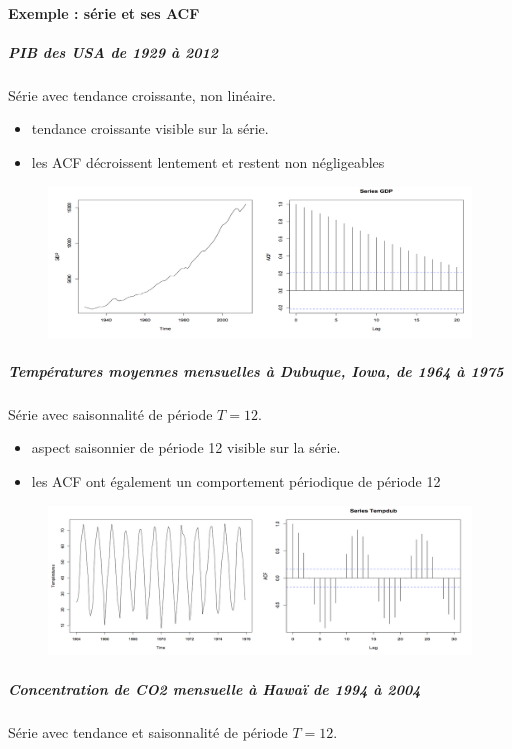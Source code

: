 \paragraph{Exemple : série et ses ACF}
\subparagraph{PIB des USA de 1929 à 2012}
Série avec tendance croissante, non linéaire.
\begin{itemize}
\item tendance croissante visible sur la série.
\item les ACF décroissent lentement et restent non négligeables
\end{itemize}
\begin{figure}[H]\begin{center}\includegraphics[scale=0.7]{ilu/ccm28.png}\end{center}\end{figure}
\subparagraph{Températures moyennes mensuelles à Dubuque, Iowa, de 1964 à 1975}
Série avec saisonnalité de période $T = 12$.
\begin{itemize}
\item aspect saisonnier de période 12 visible sur la série.
\item les ACF ont également un comportement périodique de période 12
\end{itemize}
\begin{figure}[H]\begin{center}\includegraphics[scale=0.7]{ilu/ccm29.png}\end{center}\end{figure}
\subparagraph{Concentration de CO2 mensuelle à Hawaï de 1994 à 2004}
Série avec tendance et saisonnalité de période $T = 12$.
